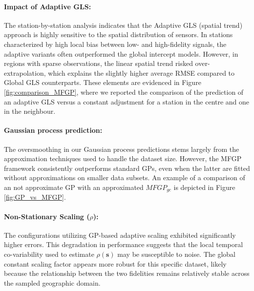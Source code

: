 \documentclass[12pt]{article}
\begin{document}
\paragraph{Impact of Adaptive GLS:}
The station-by-station analysis indicates that the Adaptive GLS (spatial trend) approach is highly sensitive to the spatial distribution of sensors. In stations characterized by high local bias between low- and high-fidelity signals, the adaptive variants often outperformed the global intercept models. However, in regions with sparse observations, the linear spatial trend risked over-extrapolation, which explains the slightly higher average RMSE compared to Global GLS counterparts. These elements are evidenced in Figure \ref{fig:comparison_MFGP}, where we reported the comparison of the prediction of an adaptive GLS versus a constant adjustment for a station in the centre and one in the neighbour.

\paragraph{Gaussian process prediction:}
The oversmoothing in our Gaussian process predictions stems largely from the approximation techniques used to handle the dataset size. However, the MFGP framework consistently outperforms standard GPs, even when the latter are fitted without approximations on smaller data subsets. An example of a comparison of an not approximate GP with an approximated $MFGP_{gc}$ is depicted in Figure \ref{fig:GP_vs_MFGP}.

\paragraph{Non-Stationary Scaling ($\rho$):}
The configurations utilizing GP-based adaptive scaling exhibited significantly higher errors. This degradation in performance suggests that the local temporal co-variability used to estimate $\rho(\bm{s})$ may be susceptible to noise. The global constant scaling factor appears more robust for this specific dataset, likely because the relationship between the two fidelities remains relatively stable across the sampled geographic domain.
\end{document}
